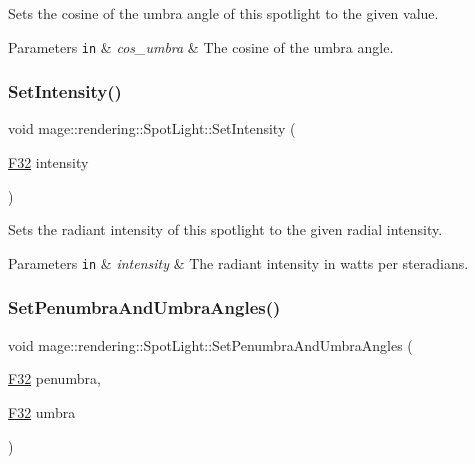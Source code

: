 Sets the cosine of the umbra angle of this spotlight to the given value.


\begin{DoxyParams}[1]{Parameters}
\mbox{\tt in}  & {\em cos\+\_\+umbra} & The cosine of the umbra angle. \\
\hline
\end{DoxyParams}
\hypertarget{classmage_1_1rendering_1_1_spot_light_aa59f043d14fb1e66377c9462c350717f}{}\label{classmage_1_1rendering_1_1_spot_light_aa59f043d14fb1e66377c9462c350717f} 
\subsubsection{\texorpdfstring{Set\+Intensity()}{SetIntensity()}}
{\footnotesize\ttfamily void mage\+::rendering\+::\+Spot\+Light\+::\+Set\+Intensity (\begin{DoxyParamCaption}\item[{\hyperlink{namespacemage_aa97e833b45f06d60a0a9c4fc22ae02c0}{F32}}]{intensity }\end{DoxyParamCaption})\hspace{0.3cm}{\ttfamily [noexcept]}}

Sets the radiant intensity of this spotlight to the given radial intensity.


\begin{DoxyParams}[1]{Parameters}
\mbox{\tt in}  & {\em intensity} & The radiant intensity in watts per steradians. \\
\hline
\end{DoxyParams}
\hypertarget{classmage_1_1rendering_1_1_spot_light_aa2e2c75dabaf5d33141d9b8a1163f317}{}\label{classmage_1_1rendering_1_1_spot_light_aa2e2c75dabaf5d33141d9b8a1163f317} 
\subsubsection{\texorpdfstring{Set\+Penumbra\+And\+Umbra\+Angles()}{SetPenumbraAndUmbraAngles()}}
{\footnotesize\ttfamily void mage\+::rendering\+::\+Spot\+Light\+::\+Set\+Penumbra\+And\+Umbra\+Angles (\begin{DoxyParamCaption}\item[{\hyperlink{namespacemage_aa97e833b45f06d60a0a9c4fc22ae02c0}{F32}}]{penumbra,  }\item[{\hyperlink{namespacemage_aa97e833b45f06d60a0a9c4fc22ae02c0}{F32}}]{umbra }\end{DoxyParamCaption})\hspace{0.3cm}{\ttfamily [noexcept]}}

